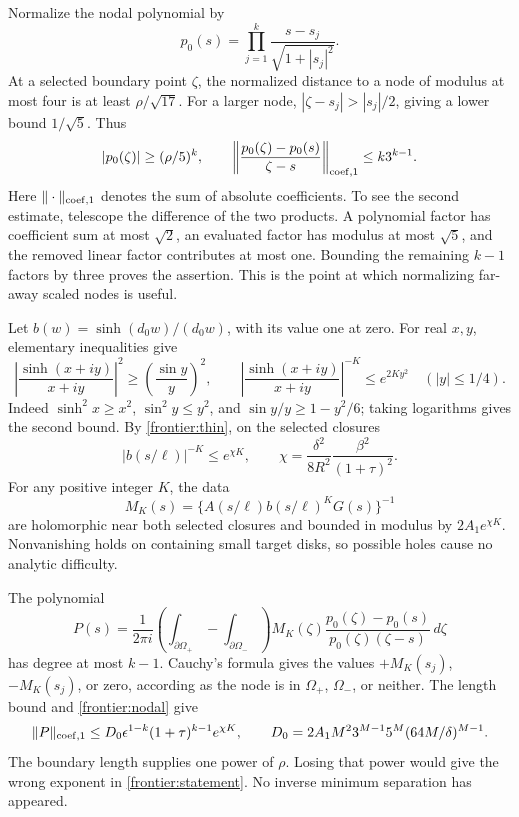 Normalize the nodal polynomial by
\[
 p_0(s)=\prod_{j=1}^k\frac{s-s_j}{\sqrt{1+|s_j|^2}}.
\]
At a selected boundary point \(\zeta\), the normalized distance
to a node of modulus at most four is at least \(\rho/\sqrt{17}\).
For a larger node, \(|\zeta-s_j|>|s_j|/2\), giving a lower
bound \(1/\sqrt5\). Thus
\begin{equation}\label{frontier:nodal}
 |p_0(\zeta)|\ge(\rho/5)^k,\qquad
 \left\|\frac{p_0(\zeta)-p_0(s)}{\zeta-s}\right\|_{\operatorname{coef},1}
 \le k3^{k-1}.
\end{equation}
Here \(\|\cdot\|_{\operatorname{coef},1}\) denotes the sum of absolute
coefficients. To see the second estimate, telescope the difference
of the two products. A polynomial factor has coefficient sum at most
\(\sqrt2\), an evaluated factor has modulus at most \(\sqrt5\),
and the removed linear factor contributes at most one. Bounding the
remaining \(k-1\) factors by three proves the assertion. This is
the point at which normalizing far-away scaled nodes is useful.

Let \(b(w)=\sinh(d_0w)/(d_0w)\), with its value one at zero.
For real \(x,y\), elementary inequalities give
\[
 \left|\frac{\sinh(x+iy)}{x+iy}\right|^2
 \ge\left(\frac{\sin y}{y}\right)^2,\qquad
 \left|\frac{\sinh(x+iy)}{x+iy}\right|^{-K}
 \le e^{2Ky^2}\quad(|y|\le1/4).
\]
Indeed \(\sinh^2x\ge x^2\), \(\sin^2y\le y^2\), and
\(\sin y/y\ge1-y^2/6\); taking logarithms gives the second
bound. By \eqref{frontier:thin}, on the selected closures
\[
 |b(s/\ell)|^{-K}\le e^{\chi K},\qquad
 \chi=\frac{\delta^2}{8R^2}\frac{\beta^2}{(1+\tau)^2}.
\]
For any positive integer \(K\), the data
\[
 M_K(s)=\{A(s/\ell)b(s/\ell)^KG(s)\}^{-1}
\]
are holomorphic near both selected closures and bounded in modulus
by \(2A_1e^{\chi K}\). Nonvanishing holds on containing small
target disks, so possible holes cause no analytic difficulty.

The polynomial
\begin{equation}\label{frontier:interpolant}
 P(s)=\frac1{2\pi i}
 \left(\int_{\partial\Omega_+}-\int_{\partial\Omega_-}\right)
 M_K(\zeta)
 \frac{p_0(\zeta)-p_0(s)}{p_0(\zeta)(\zeta-s)}\,d\zeta
\end{equation}
has degree at most \(k-1\). Cauchy's formula gives the values
\(+M_K(s_j)\), \(-M_K(s_j)\), or zero, according as the node
is in \(\Omega_+\), \(\Omega_-\), or neither. The length
bound and \eqref{frontier:nodal} give
\begin{equation}\label{frontier:coefficients}
 \|P\|_{\operatorname{coef},1}\le
 D_0\epsilon^{1-k}(1+\tau)^{k-1}e^{\chi K},\qquad
 D_0=2A_1M^2 3^{M-1}5^M(64M/\delta)^{M-1}.
\end{equation}
The boundary length supplies one power of \(\rho\). Losing that
power would give the wrong exponent in \eqref{frontier:statement}.
No inverse minimum separation has appeared.

